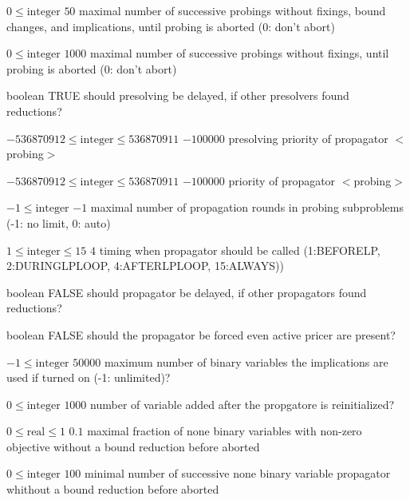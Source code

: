%
{$0\leq\textrm{integer}$}%
{$50$}%
{maximal number of successive probings without fixings, bound changes, and implications, until probing is aborted (0: don't abort)}%
{}

%
{$0\leq\textrm{integer}$}%
{$1000$}%
{maximal number of successive probings without fixings, until probing is aborted (0: don't abort)}%
{}

%
{boolean}%
{TRUE}%
{should presolving be delayed, if other presolvers found reductions?}%
{}

%
{$-536870912\leq\textrm{integer}\leq536870911$}%
{$-100000$}%
{presolving priority of propagator $<$probing$>$}%
{}

%
{$-536870912\leq\textrm{integer}\leq536870911$}%
{$-100000$}%
{priority of propagator $<$probing$>$}%
{}

%
{$-1\leq\textrm{integer}$}%
{$-1$}%
{maximal number of propagation rounds in probing subproblems (-1: no limit, 0: auto)}%
{}

%
{$1\leq\textrm{integer}\leq15$}%
{$4$}%
{timing when propagator should be called (1:BEFORELP, 2:DURINGLPLOOP, 4:AFTERLPLOOP, 15:ALWAYS))}%
{}

%
{boolean}%
{FALSE}%
{should propagator be delayed, if other propagators found reductions?}%
{}

%
{boolean}%
{FALSE}%
{should the propagator be forced even active pricer are present?}%
{}

%
{$-1\leq\textrm{integer}$}%
{$50000$}%
{maximum number of binary variables the implications are used if turned on (-1: unlimited)?}%
{}

%
{$0\leq\textrm{integer}$}%
{$1000$}%
{number of variable added after the propgatore is reinitialized?}%
{}

%
{$0\leq\textrm{real}\leq1$}%
{$0.1$}%
{maximal fraction of none binary variables with non-zero objective without a bound reduction before aborted}%
{}

%
{$0\leq\textrm{integer}$}%
{$100$}%
{minimal number of successive none binary variable propagator whithout a bound reduction before aborted}%
{}


